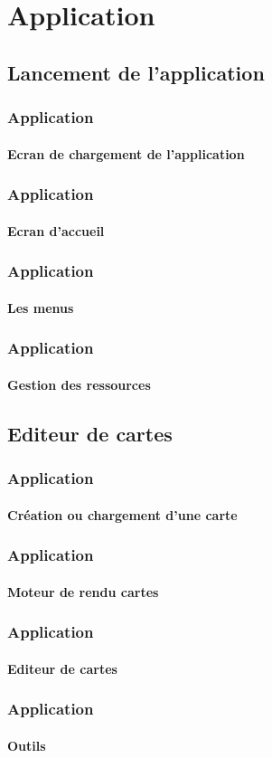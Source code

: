 \section{Application}
\subsection{Lancement de l'application}

	\begin{frame}
	\frametitle{Application}
	\framesubtitle{Ecran de chargement de l'application}
	
	\end{frame}
	
	
	\begin{frame}
	\frametitle{Application}
	\framesubtitle{Ecran d'accueil}
	
	\end{frame}
	
	\begin{frame}
	\frametitle{Application}
	\framesubtitle{Les menus}
	
	\end{frame}
	
	\begin{frame}
	\frametitle{Application}
	\framesubtitle{Gestion des ressources}
	
	
	\end{frame}


\subsection{Editeur de cartes}

	\begin{frame}
	\frametitle{Application}
	\framesubtitle{Création ou chargement d'une carte}
	
	\end{frame}
	
	\begin{frame}
	\frametitle{Application}
	\framesubtitle{Moteur de rendu cartes}
	
	\end{frame}
	
	
	\begin{frame}
	\frametitle{Application}
	\framesubtitle{Editeur de cartes}
	
	\end{frame}
	
	\begin{frame}
	\frametitle{Application}
	\framesubtitle{Outils}
	
	\end{frame}
	
